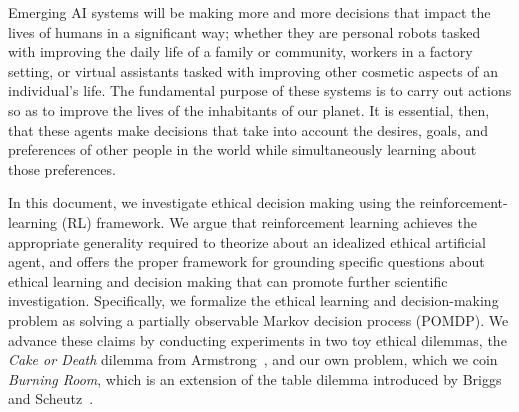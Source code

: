 \documentclass[11pt]{article}
\newcommand\jmnote[1]{\textcolor{red}{James: #1}}
\begin{document}
Emerging AI systems will be making more and more decisions that impact the lives of humans in a significant way; whether they are personal robots tasked with improving the daily life of a family or community,  workers in a factory setting, or virtual assistants tasked with improving other cosmetic aspects of an individual's life. The fundamental purpose of these systems is to carry out actions so as to improve the lives of the inhabitants of our planet. It is essential, then, that these agents make decisions that take into account the desires, goals, and preferences of other people in the world while simultaneously learning about those preferences. 

In this document, we investigate ethical decision making using the reinforcement-learning (RL) framework. We argue that reinforcement learning achieves the appropriate generality required to theorize about an idealized ethical artificial agent, and offers the proper framework for grounding specific questions about ethical learning and decision making that can promote further scientific investigation. Specifically, we formalize the ethical learning and decision-making problem as solving a partially observable Markov decision process (POMDP). We advance these claims by conducting experiments in two toy ethical dilemmas, the {\it Cake or Death} dilemma from Armstrong~, and our own problem, which we coin {\it Burning Room}, which is an extension of the table dilemma introduced by Briggs and Scheutz~.

\end{document}
